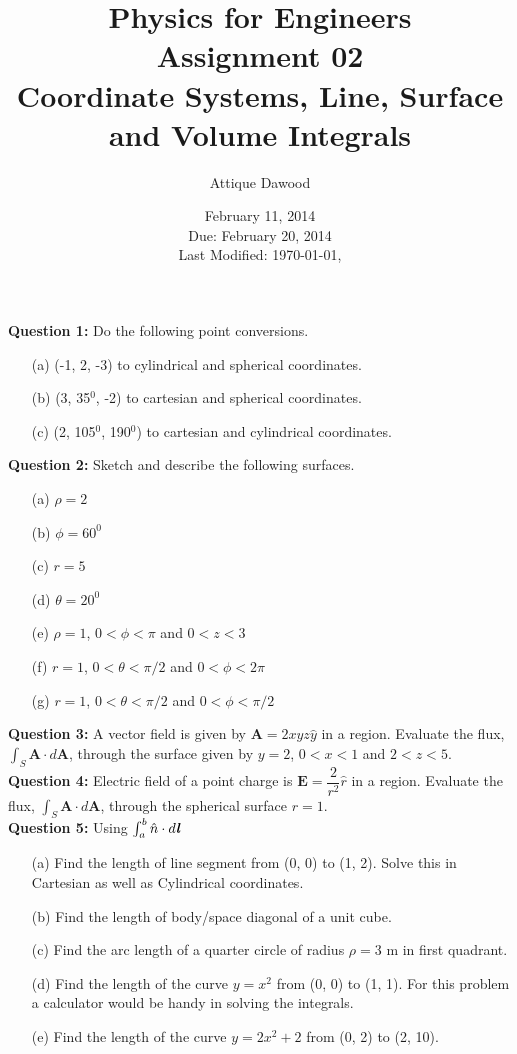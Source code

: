 \documentclass[12pt,a4paper]{article}
\title{\vspace{-3cm}Physics for Engineers\\Assignment 02\\Coordinate Systems, Line, Surface and Volume Integrals}
\author{Attique Dawood}
\date{February 11, 2014\\Due: February 20, 2014\\[0.2cm] Last Modified: \today, \currenttime}
\begin{document}
\maketitle
\noindent\textbf{Question 1:} Do the following point conversions.
\begin{itemize}
\item[(a)] (-1, 2, -3) to cylindrical and spherical coordinates.
\item[(b)] (3, 35$^0$, -2) to cartesian and spherical coordinates.
\item[(c)] (2, 105$^0$, 190$^0$) to cartesian and cylindrical coordinates.
\end{itemize}
\noindent\textbf{Question 2:} Sketch and describe the following surfaces.
\begin{itemize}
\item[(a)] $\rho=2$
\item[(b)] $\phi=60^0$
\item[(c)] $r=5$
\item[(d)] $\theta=20^0$
\item[(e)] $\rho=1$, $0<\phi<\pi$ and $0<z<3$
\item[(f)] $r=1$, $0<\theta<\pi/2$ and $0<\phi<2\pi$
\item[(g)] $r=1$, $0<\theta<\pi/2$ and $0<\phi<\pi/2$
\end{itemize}
\noindent\textbf{Question 3:} A vector field is given by $\textbf{A}=2xyz\hat y$ in a region. Evaluate the flux, $\int_{S}\textbf{A}\cdot d\textbf{A}$, through the surface given by $y=2$, $0<x<1$ and $2<z<5$.\\[0.2cm]
\noindent\textbf{Question 4:} Electric field of a point charge is $\textbf{E}=\dfrac{2}{r^2}\hat r$ in a region. Evaluate the flux, $\int_{S}\textbf{A}\cdot d\textbf{A}$, through the spherical surface $r=1$.\\[0.2cm]
\noindent\textbf{Question 5:} Using $\int_{a}^{b}\hat n\cdot d\textbf{\textit{l}}$
\begin{itemize}
\item[(a)] Find the length of line segment from (0, 0) to (1, 2). Solve this in Cartesian as well as Cylindrical coordinates.
\item[(b)] Find the length of body/space diagonal of a unit cube.
\item[(c)] Find the arc length of a quarter circle of radius $\rho=3$ m in first quadrant.
\item[(d)] Find the length of the curve $y=x^2$ from (0, 0) to (1, 1). For this problem a calculator would be handy in solving the integrals.
\item[(e)] Find the length of the curve $y=2x^2+2$ from (0, 2) to (2, 10).
\end{itemize}
\end{document}
